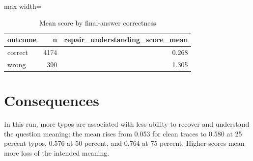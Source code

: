 \documentclass[11pt]{article}
\begin{document}
\begin{table}[H]
\centering
\caption{Mean score by final-answer correctness}
\small
\begin{adjustbox}{max width=\textwidth}
\begin{tabular}{lrr}
\toprule
\textbf{outcome} & \textbf{n} & \textbf{repair\_understanding\_score\_mean} \\
\midrule
correct & 4174 & 0.268 \\
wrong & 390 & 1.305 \\
\bottomrule
\end{tabular}
\end{adjustbox}
\end{table}

\section*{Consequences} In this run, more typos are associated with less ability to recover and understand the question meaning: the mean rises from 0.053 for clean traces to 0.580 at 25 percent typos, 0.576 at 50 percent, and 0.764 at 75 percent. Higher scores mean more loss of the intended meaning.
\end{document}

